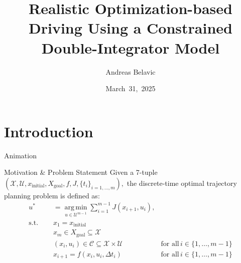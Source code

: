 \documentclass[shortpres,aspectratio=43]{beamer}
\title[Optimization-based Driving]{Realistic Optimization-based Driving Using a Constrained Double-Integrator Model}
\author[Andreas Belavic]{Andreas Belavic}
\institute[TU M\"unchen]{Technical University of Munich}
\date{March~31,~2025}
\begin{document}

\begin{frame}[plain]
  \titlepage
\end{frame}

\section{Introduction}

\begin{frame}{Animation}
\end{frame}

\begin{frame}{Motivation \& Problem Statement}
  Given a 7-tuple
  $
    (\mathcal{X}, \mathcal{U}, x_{\text{initial}}, X_{\text{goal}}, f, J, \{t_i\}_{i=1,\dots ,m}),
  $
  the discrete-time optimal trajectory planning problem is defined as:
  \begin{align}
    u^*     & = \underset{u \in \mathcal{U}^{m-1}}{\operatorname{arg\,min}} \sum_{i=1}^{m-1}
    J(x_{i+1}, u_{i}),                                                                                                                  \\ \text{s.t.
    } \quad & x_1  = x_{\text{initial}}                                                                                                 \\
            & x_m          \in X_{\text{goal}} \subseteq \mathcal{X}                                                                    \\
            & (x_i, u_i)   \in \mathcal{C} \subseteq \mathcal{X} \times \mathcal{U}          & \text{for all}\, i \in \{1, \dots, m-1\} \\
            & x_{i+1}      = f(x_i, u_i, \Delta t_i)                                         & \text{for all}\, i \in \{1, \dots, m-1\}
  \end{align}
\end{frame}
\end{document}
